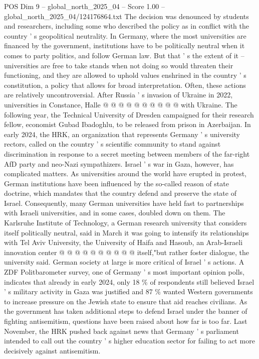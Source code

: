 \begin{textsample}{POS Dim 9 – global\_north\_2025\_04 – Score 1.00 – global\_north\_2025\_04/124176864.txt}
The decision was denounced by students and researchers, including some who described the policy as in conflict with the country ' s geopolitical neutrality.
In Germany, where the most universities are financed by the government, institutions have to be politically neutral when it comes to party politics, and follow German law.
But that ' s the extent of it -- universities are free to take stands when not doing so would threaten their functioning, and they are allowed to uphold values enshrined in the country ' s constitution, a policy that allows for broad interpretation.
Often, these actions are relatively uncontroversial.
After Russia ' s invasion of Ukraine in 2022, universities in Constance, Halle @ @ @ @ @ @ @ @ @ @ with Ukraine.
The following year, the Technical University of Dresden campaigned for their research fellow, economist Gubad Ibadoghlu, to be released from prison in Azerbaijan.
In early 2024, the HRK, an organization that represents Germany ' s university rectors, called on the country ' s scientific community to stand against discrimination in response to a secret meeting between members of the far-right AfD party and neo-Nazi sympathizers.
Israel ' s war in Gaza, however, has complicated matters.
As universities around the world have erupted in protest, German institutions have been influenced by the so-called reason of state doctrine, which mandates that the country defend and preserve the state of Israel.
Consequently, many German universities have held fast to partnerships with Israeli universities, and in some cases, doubled down on them.
The Karlsruhe Institute of Technology, a German research university that considers itself politically neutral, said in March it was going to intensify its relationships with Tel Aviv University, the University of Haifa and Hasoub, an Arab-Israeli innovation center @ @ @ @ @ @ @ @ @ @ itself,"but rather foster dialogue, the university said.
German society at large is more critical of Israel ' s actions.
A ZDF Politbarometer survey, one of Germany ' s most important opinion polls, indicates that already in early 2024, only 18 \% of respondents still believed Israel ' s military activity in Gaza was justified and 87 \% wanted Western governments to increase pressure on the Jewish state to ensure that aid reaches civilians.
As the government has taken additional steps to defend Israel under the banner of fighting antisemitism, questions have been raised about how far is too far.
Last November, the HRK pushed back against news that Germany ' s parliament intended to call out the country ' s higher education sector for failing to act more decisively against antisemitism.

\end{textsample}
